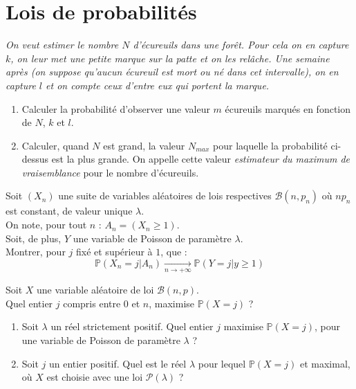 \section{Lois de probabilit\'es}

\begin{exer}
\textit{On veut estimer le nombre $N$ d'\'ecureuils dans une for\^et. %
Pour cela on en capture $k$, on leur met une petite marque sur la patte et on les rel\^ache. %
Une semaine apr\`es (on suppose qu'aucun \'ecureuil est mort ou n\'e dans cet intervalle), %
on en capture $l$ et on compte ceux d'entre eux qui portent la marque.}
\ligneinter
\begin{enumerate}
\item Calculer la probabilit\'e d'observer une valeur $m$ \'ecureuils marqu\'es  en fonction de $N$, $k$ et $l$.
\item Calculer, quand $N$ est grand, la valeur $N_{max}$ pour laquelle la probabilit\'e ci-dessus est la plus grande. On appelle cette valeur \textit{estimateur du maximum de vraisemblance} pour le nombre d'\'ecureuils.
\end{enumerate}
\end{exer}

\begin{exer}
Soit $(X_n)$ une suite de variables al\'eatoires de lois respectives $\mathcal{B}(n,p_n)$ o\`u $np_n$ est constant, de valeur unique $\lambda$.\\
On note, pour tout $n$ : $A_n = (X_n \geq 1)$.\\
Soit, de plus, $Y$ une variable de Poisson de param\`etre $\lambda$.\\
Montrer, pour $j$ fix\'e et sup\'erieur \`a $1$, que :\[\mathbb{P}(X_n=j|A_n)\underset{n\rightarrow +\infty}{\longrightarrow}\mathbb{P}(Y=j|y\geq 1)\]
\end{exer}

\begin{exer}
Soit $X$ une variable al\'eatoire de loi $\mathcal{B}(n,p)$.\\
Quel entier $j$ compris entre $0$ et $n$, maximise $\mathbb{P}(X=j)$ ?
\end{exer}

\begin{exer}
\begin{enumerate}
\item Soit $\lambda$ un r\'eel strictement positif. Quel entier $j$ maximise $\mathbb{P}(X=j)$, pour une variable de Poisson de param\`etre $\lambda$ ?
\item Soit $j$ un entier positif. Quel est le r\'eel $\lambda$ pour lequel $\mathbb{P}(X=j)$ et maximal, o\`u $X$ est choisie avec une loi $\mathcal{P}(\lambda)$ ?
\end{enumerate}
\end{exer}

